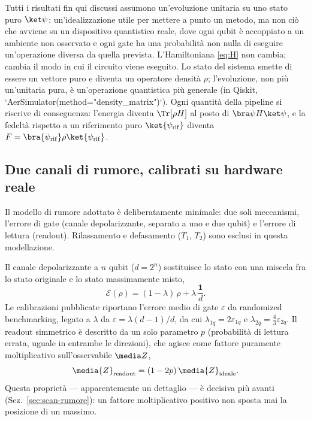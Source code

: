 \documentclass[11pt,a4paper]{article}
\begin{document}
Tutti i risultati fin qui discussi assumono un'evoluzione unitaria su uno
stato puro $\ket\psi$: un'idealizzazione utile per mettere a punto un
metodo, ma non ciò che avviene su un dispositivo quantistico reale, dove
ogni qubit è accoppiato a un ambiente non osservato e ogni gate ha una
probabilità non nulla di eseguire un'operazione diversa da quella
prevista. L'Hamiltoniana \eqref{eq:H} non cambia; cambia il modo in cui il
circuito viene eseguito. Lo stato del sistema smette di essere un vettore
puro e diventa un operatore densità $\rho$; l'evoluzione, non più
un'unitaria pura, è un'operazione quantistica più generale (in Qiskit,
`AerSimulator(method="density\_matrix")`). Ogni quantità della pipeline si
riscrive di conseguenza: l'energia diventa $\Tr[\rho H]$ al posto di
$\bra\psi H\ket\psi$, e la fedeltà rispetto a un riferimento puro
$\ket{\psi_{\rm rif}}$ diventa $F=\bra{\psi_{\rm rif}}\rho\ket{\psi_{\rm rif}}$.

\subsection{Due canali di rumore, calibrati su hardware reale}

Il modello di rumore adottato è deliberatamente minimale: due soli
meccanismi, l'errore di gate (canale depolarizzante, separato a uno e due
qubit) e l'errore di lettura (readout). Rilassamento e defasamento
($T_1$, $T_2$) sono esclusi in questa modellazione.

Il canale depolarizzante a $n$ qubit ($d=2^n$) sostituisce lo stato con
una miscela fra lo stato originale e lo stato massimamente misto,
\begin{equation}
\mathcal{E}(\rho) = (1-\lambda)\,\rho + \lambda\,\frac{\mathbf 1}{d}.
\label{eq:depolarizzante}
\end{equation}
Le calibrazioni pubblicate riportano l'errore medio di gate $\varepsilon$
da randomized benchmarking, legato a $\lambda$ da
$\varepsilon=\lambda(d-1)/d$, da cui $\lambda_{1q}=2\varepsilon_{1q}$ e
$\lambda_{2q}=\tfrac43\varepsilon_{2q}$. Il readout simmetrico è descritto
da un solo parametro $p$ (probabilità di lettura errata, uguale in
entrambe le direzioni), che agisce come fattore puramente moltiplicativo
sull'osservabile $\media Z$,
\begin{equation}
\media{Z}_{\rm readout} = (1-2p)\,\media{Z}_{\rm ideale}.
\label{eq:readout-simmetrico}
\end{equation}
Questa proprietà --- apparentemente un dettaglio --- è decisiva più avanti
(Sez.~\ref{sec:scan-rumore}): un fattore moltiplicativo positivo non
sposta mai la posizione di un massimo.
\end{document}
